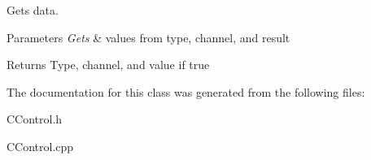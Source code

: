 Gets data.


\begin{DoxyParams}{Parameters}
{\em Gets} & values from type, channel, and result\\
\hline
\end{DoxyParams}
\begin{DoxyReturn}{Returns}
Type, channel, and value if true 
\end{DoxyReturn}


The documentation for this class was generated from the following files\+:\begin{DoxyCompactItemize}
\item 
C\+Control.\+h\item 
C\+Control.\+cpp\end{DoxyCompactItemize}
